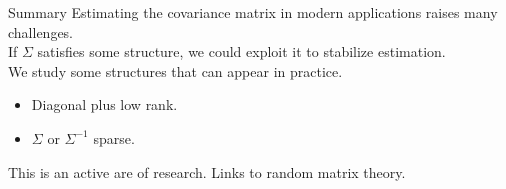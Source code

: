 \documentclass[11pt,handout,aspectratio=169]{beamer}
\begin{document}
\begin{frame}{Summary}
	Estimating the covariance matrix in modern applications raises many challenges. \\[5mm]
	If $\Sigma$ satisfies some structure, we could exploit it to stabilize estimation. \\[5mm]
	We study some structures that can appear in  practice.
	\begin{itemize}
		\item Diagonal plus low rank.
		\item $\Sigma$ or $\Sigma^{-1}$ sparse.\\[5mm]
	\end{itemize}  
	
	This is an active are of research. Links to random matrix theory.
	
\end{frame}
\end{document}
